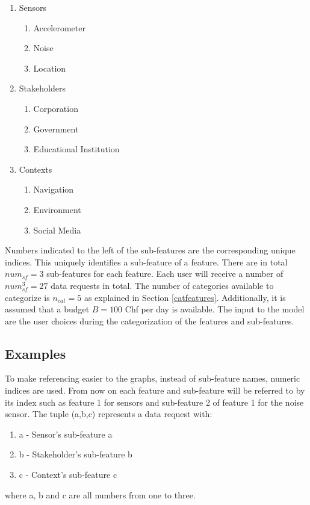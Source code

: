 \begin{enumerate}
    \item Sensors
    \begin{enumerate}
    \item Accelerometer 
    \item Noise 
    \item Location 
   \end{enumerate}
    \item Stakeholders 
    \begin{enumerate}
    \item Corporation 
    \item Government 
    \item Educational Institution 
   \end{enumerate}
   \item Contexts
    \begin{enumerate}
    \item Navigation 
    \item Environment 
    \item Social Media 
   \end{enumerate}
 \end{enumerate}
 
Numbers indicated to the left of the sub-features are the corresponding unique indices. This uniquely identifies a sub-feature of a feature. There are in total $num_{sf}=3$ sub-features for each feature.
Each user will receive a number of $num_{sf}^3=27$ data requests in total. The number of categories available to categorize is $n_{cat}=5$ as explained in Section \ref{catfeatures}. Additionally, it is assumed that a budget $B=100$ Chf per day is available. 
The input to the model are the user choices during the categorization of the features and sub-features.

\subsection{Examples}

To make referencing easier to the graphs, instead of sub-feature names, numeric indices are used. From now on each feature and sub-feature will be referred to by its index such as feature 1 for sensors and sub-feature 2 of feature 1 for the noise sensor. The tuple (a,b,c) represents a data request with:
\begin{enumerate}
    \item a - Sensor's sub-feature a
    \item b - Stakeholder's sub-feature b
    \item c - Context's sub-feature c
   \end{enumerate}
where a, b and c are all numbers from one to three. 


